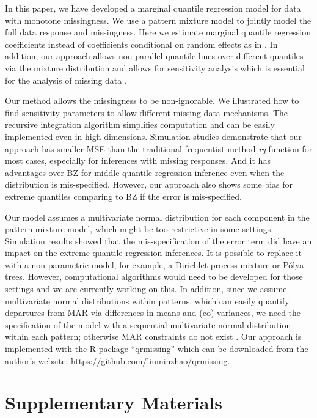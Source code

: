 \documentclass[useAMS,usenatbib,referee]{biom}
\newcommand{\polya}{P\'{o}lya} \newcommand{\yobs}{\bmath y_{\itl{obs}}}
\begin{document}
In this paper, we have developed a marginal quantile regression model
for data with monotone missingness. We use a pattern mixture model to
jointly model the full data response and missingness. Here we estimate
marginal quantile regression coefficients instead of coefficients
conditional on random effects as in \citet{yuan2010}. In addition, our
approach allows non-parallel quantile lines over different quantiles
via the mixture distribution and allows for sensitivity analysis which
is essential for the analysis of missing data \citep{nas2010}.

Our method allows the missingness to be non-ignorable.
We illustrated how to find sensitivity parameters to allow different missing data mechanisms. The
recursive integration algorithm simplifies computation and can be
easily implemented even in high dimensions. Simulation studies
demonstrate that our approach has smaller MSE than the traditional
frequentist method \textit{rq} function for most cases, especially for
inferences with missing responses. And it has advantages over
BZ for middle quantile regression inference even when
the distribution is mis-specified.  However, our approach also shows
some bias for extreme quantiles comparing to BZ if the
error is mis-specified.

Our model assumes a multivariate normal distribution for each
component in the pattern mixture model, which might be too restrictive
in some settings. Simulation results showed that the mis-specification
of the error term did have an impact on the extreme quantile
regression inferences.  It is possible to replace it with a
non-parametric model, for example, a Dirichlet process mixture or
\polya{} trees. However, computational algorithms would need to be
developed for those settings and we are currently working on this. In addition, since we assume
multivariate normal distributions within patterns, which can easily
quantify departures from MAR via differences in means and
(co)-variances, we need the specification of the model with a sequential
multivariate normal distribution within each pattern; otherwise MAR
constraints do not exist \citep{wang2011}.
Our approach is implemented with the R package ``qrmissing'' which can be downloaded from the author's website: \url{https://github.com/liuminzhao/qrmissing}.

\backmatter

\section*{Supplementary Materials}
\end{document}
